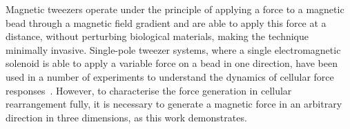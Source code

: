 Magnetic tweezers operate under the principle of applying a force to a magnetic bead through a magnetic field gradient and are able to apply this force at a distance, without perturbing biological materials, making the technique minimally invasive.
Single-pole tweezer systems, where a single electromagnetic solenoid is able to apply a variable force on a bead in one direction, have been used in a number of experiments to understand the dynamics of cellular force responses~\cite{overbyNovelDynamicRheological2005}.
However, to characterise the force generation in cellular rearrangement fully, it is necessary to generate a magnetic force in an arbitrary direction in three dimensions, as this work demonstrates.
%
%

